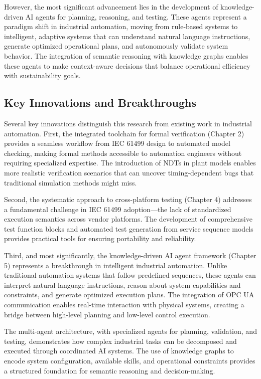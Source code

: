 However, the most significant advancement lies in the development of knowledge-driven AI agents for planning, reasoning, and testing. These agents represent a paradigm shift in industrial automation, moving from rule-based systems to intelligent, adaptive systems that can understand natural language instructions, generate optimized operational plans, and autonomously validate system behavior. The integration of semantic reasoning with knowledge graphs enables these agents to make context-aware decisions that balance operational efficiency with sustainability goals.

\subsection{Key Innovations and Breakthroughs}

Several key innovations distinguish this research from existing work in industrial automation. First, the integrated toolchain for formal verification (Chapter 2) provides a seamless workflow from IEC 61499 design to automated model checking, making formal methods accessible to automation engineers without requiring specialized expertise. The introduction of NDTs in plant models enables more realistic verification scenarios that can uncover timing-dependent bugs that traditional simulation methods might miss.

Second, the systematic approach to cross-platform testing (Chapter 4) addresses a fundamental challenge in IEC 61499 adoption—the lack of standardized execution semantics across vendor platforms. The development of comprehensive test function blocks and automated test generation from service sequence models provides practical tools for ensuring portability and reliability.

Third, and most significantly, the knowledge-driven AI agent framework (Chapter 5) represents a breakthrough in intelligent industrial automation. Unlike traditional automation systems that follow predefined sequences, these agents can interpret natural language instructions, reason about system capabilities and constraints, and generate optimized execution plans. The integration of OPC UA communication enables real-time interaction with physical systems, creating a bridge between high-level planning and low-level control execution.

The multi-agent architecture, with specialized agents for planning, validation, and testing, demonstrates how complex industrial tasks can be decomposed and executed through coordinated AI systems. The use of knowledge graphs to encode system configuration, available skills, and operational constraints provides a structured foundation for semantic reasoning and decision-making.

